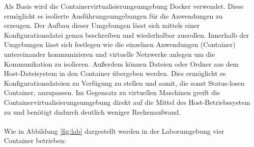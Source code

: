 Als Basis wird die Containervirtualisierungsumgebung Docker verwendet.
Diese ermöglicht es isolierte Ausführungsumgebungen für die Anwendungen zu erzeugen.
Der Aufbau dieser Umgebungen lässt sich mittels einer Konfigurationsdatei genau beschreiben und wiederholbar ausrollen.
Innerhalb der Umgebungen lässt sich festlegen wie die einzelnen Anwendungen (Container) untereinander kommunizieren und virtuelle Netzwerke anlegen um die Kommunikation zu isolieren.
Außerdem können Dateien oder Ordner aus dem Host-Dateisystem in den Container übergeben werden.
Dies ermöglicht es Konfigurationsdateien zu Verfügung zu stellen und somit, die sonst Status-losen Container, anzupassen.
Im Gegensatz zu virtuellen Maschinen greift die Containervirtualisierungsumgebung direkt auf die Mittel des Host-Betriebssystem zu und benötigt dadurch deutlich weniger Rechenaufwand.\\
\ \\
Wie in Abbildung \ref{fig:lab} dargestellt werden in der Laborumgebung vier Container betrieben:
